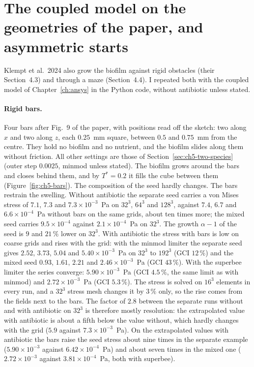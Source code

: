 \section{The coupled model on the geometries of the paper, and asymmetric starts}
\label{sec:ch5-geometry}

Klempt et al.\ 2024 also grow the biofilm against rigid obstacles (their Section~4.3) and through a maze
(Section~4.4). I repeated both with the coupled model of Chapter~\ref{ch:ansys} in the Python code, without antibiotic
unless stated.

\paragraph{Rigid bars.} Four bars after Fig.~9 of the paper, with positions read off the sketch: two along
$x$ and two along $z$, each $0.25$~mm square, between $0.5$ and $0.75$~mm from the centre. They hold no
biofilm and no nutrient, and the biofilm slides along them without friction. All other settings are those of
Section~\ref{sec:ch5-two-species} (outer step $0.0025$, minmod unless stated). The biofilm grows around the bars
and closes behind them, and by $T^*=0.2$ it fills the cube between them (Figure~\ref{fig:ch5-bars}). The
composition of the seed hardly changes. The bars restrain the swelling. Without antibiotic the separate seed
carries a von Mises stress of $7.1$, $7.3$ and $7.3\times10^{-3}$~Pa on $32^3$, $64^3$ and $128^3$, against $7.4$,
$6.7$ and $6.6\times10^{-4}$~Pa without bars on the same grids, about ten times more; the mixed seed carries
$9.5\times10^{-4}$ against $2.1\times10^{-4}$~Pa on $32^3$. The growth $\alpha-1$ of the seed is $9$ and
$21\,\%$ lower on $32^3$.
With antibiotic the stress with bars is low on coarse grids and rises with the grid: with the minmod limiter the
separate seed gives $2.52$, $3.73$, $5.04$ and $5.40\times10^{-3}$~Pa on $32^3$ to $192^3$ (GCI $12\,\%$) and the
mixed seed $0.93$, $1.61$, $2.21$ and $2.46\times10^{-3}$~Pa (GCI $43\,\%$). With the superbee limiter the series
converge: $5.90\times10^{-3}$~Pa (GCI $4.5\,\%$, the same limit as with minmod) and $2.72\times10^{-3}$~Pa
(GCI $5.3\,\%$). The stress is solved on $16^3$ elements in every run, and a $32^3$ stress mesh changes it by
$3\,\%$ only, so the rise comes from the fields next to the bars. The factor of $2.8$ between the separate runs
without and with antibiotic on $32^3$ is therefore mostly resolution: the extrapolated value with antibiotic is
about a fifth below the value without, which hardly changes with the grid ($5.9$ against $7.3\times10^{-3}$~Pa). On the extrapolated values
with antibiotic the bars raise the seed stress about nine times in the separate example ($5.90\times10^{-3}$
against $6.42\times10^{-4}$~Pa) and about seven times in the mixed one ($2.72\times10^{-3}$ against
$3.81\times10^{-4}$~Pa, both with superbee).

